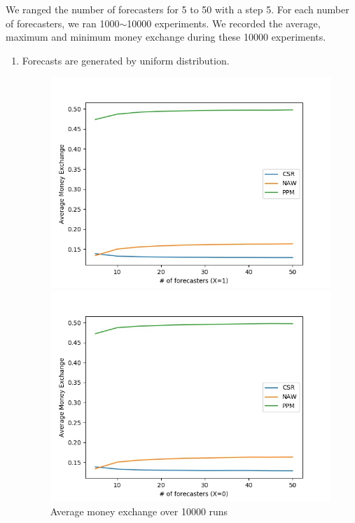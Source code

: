 \documentclass[english,10pt]{article}
\begin{document}
\begin{enumerate}
	We ranged the number of forecasters for 5 to 50 with a step 5. For each number of forecasters, we ran 1000$\sim$10000 experiments. We recorded the average, maximum and minimum money exchange during these 10000 experiments.
	\begin{enumerate}
	\newpage
	\item Forecasts are generated by uniform distribution.
        	\begin{figure}[H]
        	\centering
        	\begin{minipage}{0.48\textwidth}
        	\includegraphics[width = \textwidth]{(uniform)Avg_MnEx(X=1).jpg}
        	\end{minipage}
        	\begin{minipage}{0.48\textwidth}
        	\includegraphics[width = \textwidth]{(uniform)Avg_MnEx(X=0).jpg}
        	\end{minipage}
        	\caption{Average money exchange over 10000 runs}
        	\end{figure}
        	

\end{enumerate}
\end{enumerate}
\end{document}
